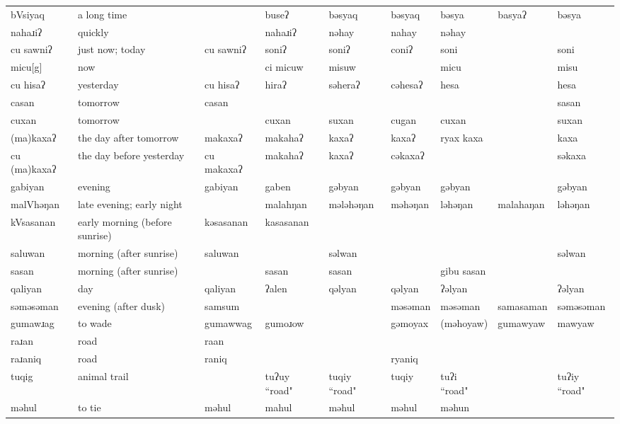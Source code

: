 \begin{landscape}
\begin{longtable}{*{9}{p{}}}
\text{*}bVsiyaq & a long time &  & buseʔ & bəsyaq & bəsyaq & bəsya & basyaʔ & bəsya\\
\text{*}nahaɹiʔ & quickly &  & nahaɹiʔ & nəhay & nahay & nəhay &  & \\
\text{*}cu sawniʔ & just now; today & cu sawniʔ & soniʔ & soniʔ & coniʔ & soni &  & soni\\
\text{*}micu[g] & now &  & ci micuw & misuw &  & micu &  & misu\\
\text{*}cu hisaʔ & yesterday & cu hisaʔ & hiraʔ & səheraʔ & cəhesaʔ & hesa &  & hesa\\
\text{*}casan & tomorrow & casan &  &  &  &  &  & sasan\\
\text{*}cuxan & tomorrow &  & cuxan & suxan & cugan & cuxan &  & suxan\\
\text{*}(ma)kaxaʔ & the day after tomorrow & makaxaʔ & makahaʔ & kaxaʔ & kaxaʔ & ryax kaxa &  & kaxa\\
\text{*}cu (ma)kaxaʔ & the day before yesterday & cu makaxaʔ & makahaʔ & kaxaʔ & cəkaxaʔ &  &  & səkaxa\\
\text{*}gabiyan & evening & gabiyan & gaben & gəbyan & gəbyan & gəbyan &  & gəbyan\\
\text{*}malVhəŋan & late evening; early night &  & malahŋan & mələhəŋan & məhəŋan & ləhəŋan & malahaŋan & ləhəŋan\\
\text{*}kVsasanan & early morning (before sunrise) & kəsasanan & kasasanan &  &  &  &  & \\
\text{*}saluwan & morning (after sunrise) & saluwan &  & səlwan &  &  &  & səlwan\\
\text{*}sasan & morning (after sunrise) &  & sasan & sasan &  & gibu sasan &  & \\
\text{*}qaliyan & day & qaliyan & ʔalen & qəlyan & qəlyan & ʔəlyan &  & ʔəlyan\\
\text{*}səməsəman & evening (after dusk) & samsum &  &  & məsəman & məsəman & samasaman & səməsəman\\
\text{*}gumawɹag & to wade & gumawwag & gumoɹow &  & gəmoyax & (məhoyaw) & gumawyaw & mawyaw\\
\text{*}raɹan & road & raan &  &  &  &  &  & \\
\text{*}raɹaniq & road & raniq &  &  & ryaniq &  &  & \\
\text{*}tuqig & animal trail &  & tuʔuy ``road" & tuqiy ``road" & tuqiy & tuʔi ``road" &  & tuʔiy ``road"\\
\text{*}məhul & to tie & məhul & mahul & məhul & məhul & məhun &  & \\

\end{longtable}
\end{landscape}
